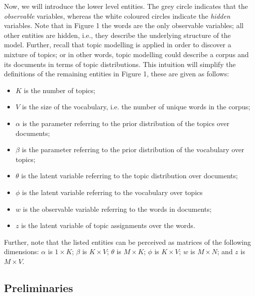 \documentclass{mprop}
\begin{document}
\par Now, we will introduce the lower level entities. The grey circle indicates that the \textit{observable} variables, whereas the white coloured circles indicate the \textit{hidden} variables. Note that in Figure 1 the words are the only observable variables; all other entities are hidden, i.e., they describe the underlying structure of the model. Further, recall that topic modelling is applied in order to discover a mixture of topics; or in other words, topic modelling could describe a corpus and its documents in terms of topic distributions. This intuition will simplify the definitions of the remaining entities in Figure 1, these are given as follows:
\begin{itemize}
\item $K$ is the number of topics;
\item $V$ is the size of the vocabulary, i.e. the number of unique words in the corpus;
\item $\alpha$ is the parameter referring to the prior distribution of the topics over documents;
\item $\beta$ is the parameter referring to the prior distribution of the vocabulary over topics;
\item $\theta$ is the latent variable referring to the topic distribution over documents;
\item $\phi$ is the latent variable referring to the vocabulary over topics
\item $w$ is the observable variable referring to the words in documents;
\item $z$ is the latent variable of topic assignments over the words.
\end{itemize}
Further, note that the listed entities can be perceived as matrices of the following dimensions: $\alpha$ is $1 \times K$; $\beta$ is $K \times V$; $\theta$ is $M \times K$; $\phi$ is $K \times V$; $w$ is $M \times N$; and $z$ is $M \times V$.

\subsection{Preliminaries}
\end{document}
